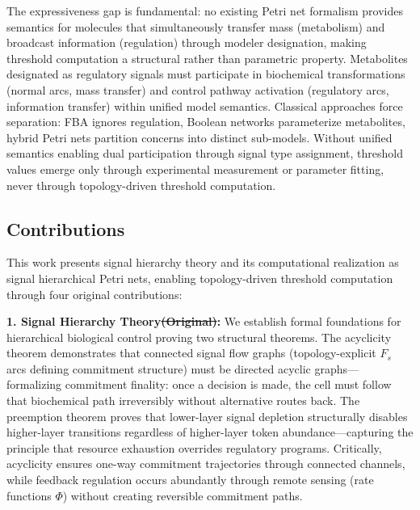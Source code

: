 \documentclass[10pt,letterpaper]{article}
\providecommand{\DIFaddtex}[1]{{\protect\color{blue}\uwave{#1}}} %
\providecommand{\DIFdeltex}[1]{{\protect\color{red}\sout{#1}}}                      %
\providecommand{\DIFaddbegin}{} %
\providecommand{\DIFaddend}{} %
\providecommand{\DIFdelbegin}{} %
\providecommand{\DIFdelend}{} %
\providecommand{\DIFadd}[1]{\texorpdfstring{\DIFaddtex{#1}}{#1}} %
\providecommand{\DIFdel}[1]{\texorpdfstring{\DIFdeltex{#1}}{}} %
\newcommand{\DIFscaledelfig}{0.5}
\newlength{\DIFdelgraphicswidth} %
\newlength{\DIFdelgraphicsheight} %
\newcommand{\DIFaddincludegraphics}[2][]{{\color{blue}\fbox{\DIFOincludegraphics[#1]{#2}}}} %
\newcommand{\DIFdelincludegraphics}[2][]{%
\sbox{\DIFdelgraphicsbox}{\DIFOincludegraphics[#1]{#2}}%
\settoboxwidth{\DIFdelgraphicswidth}{\DIFdelgraphicsbox} %
\settoboxtotalheight{\DIFdelgraphicsheight}{\DIFdelgraphicsbox} %
\scalebox{\DIFscaledelfig}{%
\parbox[b]{\DIFdelgraphicswidth}{\usebox{\DIFdelgraphicsbox}\\[-\baselineskip] \rule{\DIFdelgraphicswidth}{0em}}\llap{\resizebox{\DIFdelgraphicswidth}{\DIFdelgraphicsheight}{%
\setlength{\unitlength}{\DIFdelgraphicswidth}%
\begin{picture}(1,1)%
\thicklines\linethickness{2pt} %
{\color[rgb]{1,0,0}\put(0,0){\framebox(1,1){}}}%
{\color[rgb]{1,0,0}\put(0,0){\line( 1,1){1}}}%
{\color[rgb]{1,0,0}\put(0,1){\line(1,-1){1}}}%
\end{picture}%
}\hspace*{3pt}}} %
} %
\DeclareRobustCommand{\DIFaddbegin}{\DIFOaddbegin \let\includegraphics\DIFaddincludegraphics} %
\DeclareRobustCommand{\DIFaddend}{\DIFOaddend \let\includegraphics\DIFOincludegraphics} %
\DeclareRobustCommand{\DIFdelbegin}{\DIFOdelbegin \let\includegraphics\DIFdelincludegraphics} %
\DeclareRobustCommand{\DIFdelend}{\DIFOaddend \let\includegraphics\DIFOincludegraphics} %
\begin{document}
The expressiveness gap is fundamental: no existing Petri net formalism provides semantics for molecules that simultaneously transfer mass (metabolism) and broadcast information (regulation) through modeler designation, making threshold computation a structural rather than parametric property. Metabolites designated as regulatory signals must participate in biochemical transformations (normal arcs, mass transfer) and control pathway activation (regulatory arcs, information transfer) within unified model semantics. Classical approaches force separation: FBA ignores regulation, Boolean networks parameterize metabolites, hybrid Petri nets partition concerns into distinct sub-models. Without unified semantics enabling dual participation through signal type assignment, threshold values emerge only through experimental measurement or parameter fitting, never through topology-driven threshold computation.

\subsection{Contributions}

This work presents signal hierarchy theory and its computational realization as signal hierarchical Petri nets, enabling topology-driven threshold computation through four original contributions:

\textbf{1. Signal Hierarchy Theory\DIFdelbegin \DIFdel{(Original)}\DIFdelend :} We establish formal foundations for hierarchical biological control proving two structural theorems. The acyclicity theorem demonstrates that connected signal flow graphs (topology-explicit $F_s$ arcs defining commitment structure) must be directed acyclic graphs---formalizing commitment finality: once a decision is made, the cell must follow that biochemical path irreversibly without alternative routes back. The preemption theorem proves that lower-layer signal depletion structurally disables higher-layer transitions regardless of higher-layer token abundance---capturing the principle that resource exhaustion overrides regulatory programs. Critically, acyclicity ensures one-way commitment trajectories through connected channels, while feedback regulation occurs abundantly through remote sensing (rate functions $\Phi$\DIFaddbegin \DIFadd{; formally defined in Section~\ref{sec:unified}}\DIFaddend ) without creating reversible commitment paths.
\end{document}
